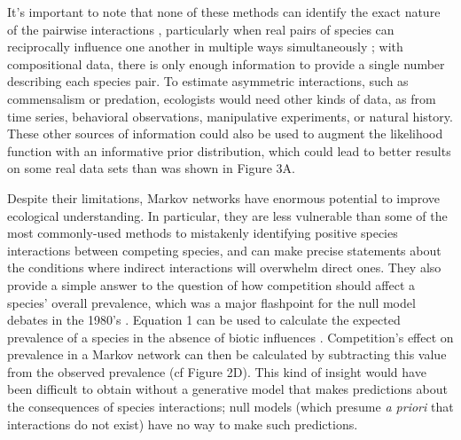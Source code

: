 It's important to note that none of these methods can identify the exact
nature of the pairwise interactions \citep[e.g.~which species in a
positively-associated pair is facilitating the
other;][]{schmidt_modeling_2012}, particularly when real pairs of
species can reciprocally influence one another in multiple ways
simultaneously \citep{bruno_inclusion_2003}; with compositional data,
there is only enough information to provide a single number describing
each species pair. To estimate asymmetric interactions, such as
commensalism or predation, ecologists would need other kinds of data, as
from time series, behavioral observations, manipulative experiments, or
natural history. These other sources of information could also be used
to augment the likelihood function with an informative prior
distribution, which could lead to better results on some real data sets
than was shown in Figure 3A.

Despite their limitations, Markov networks have enormous potential to
improve ecological understanding. In particular, they are less
vulnerable than some of the most commonly-used methods to mistakenly
identifying positive species interactions between competing species, and
can make precise statements about the conditions where indirect
interactions will overwhelm direct ones. They also provide a simple
answer to the question of how competition should affect a species'
overall prevalence, which was a major flashpoint for the null model
debates in the 1980's
\citep{roughgarden_competition_1983, strong_ecological_1984}. Equation 1
can be used to calculate the expected prevalence of a species in the
absence of biotic influences
\citep[\(\frac{e^\alpha}{1 + e^{\alpha}}\);][]{lee_learning_2012}.
Competition's effect on prevalence in a Markov network can then be
calculated by subtracting this value from the observed prevalence (cf
Figure 2D). This kind of insight would have been difficult to obtain
without a generative model that makes predictions about the consequences
of species interactions; null models (which presume \emph{a priori} that
interactions do not exist) have no way to make such predictions.

